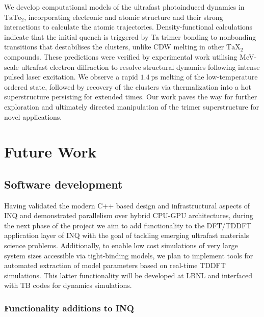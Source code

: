 We develop computational models of the ultrafast photoinduced dynamics in \(\mathrm{TaTe_2}\), incorporating  electronic and atomic structure and their strong interactions to calculate the atomic trajectories. 
Density-functional calculations indicate that the initial quench is triggered by Ta trimer bonding to nonbonding transitions that destabilises the clusters, unlike CDW melting in other \(\mathrm{TaX_2}\) compounds. 
These predictions were verified by experimental work utilising MeV-scale ultrafast electron diffraction to resolve structural dynamics following intense pulsed laser excitation. 
We observe a rapid \(1.4~\mathrm{ps}\) melting of the low-temperature ordered state, followed by recovery of the clusters via thermalization into a hot superstructure persisting for extended times.
Our work paves the way for further exploration and ultimately directed manipulation of the trimer superstructure for novel applications.

\section{Future Work}

\subsection{Software development}
Having validated the modern C++ based design and infrastructural aspects of \textsc{INQ} and demonstrated parallelism over hybrid CPU-GPU architectures, during the next phase of the project we aim to add functionality to the DFT/TDDFT application layer of  \textsc{INQ} with the goal of tackling emerging ultrafast materials science problems. Additionally, to enable low cost simulations of very large system sizes accessible via tight-binding models, we plan to implement tools for automated extraction of model parameters based on real-time TDDFT simulations. This latter functionality will be developed at LBNL and interfaced with TB codes for dynamics simulations.

\subsubsection{Functionality additions to INQ}

